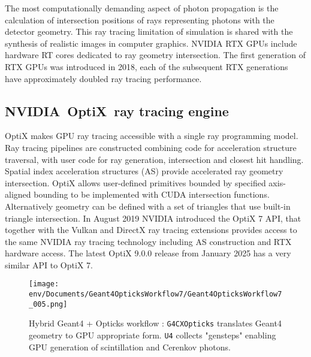 \documentclass{webofc}
\begin{document}
The most computationally demanding aspect of photon propagation
is the calculation of intersection positions of rays representing photons with the detector geometry.
This ray tracing limitation of simulation is shared with the synthesis of realistic images in computer graphics. 
NVIDIA RTX\cite{rtx} GPUs include hardware RT cores dedicated to ray geometry intersection. 
The first generation of RTX GPUs was introduced in 2018, each of the subsequent RTX generations have 
approximately doubled ray tracing performance.  
%
%
\subsection{NVIDIA\textregistered\ OptiX\texttrademark\ ray tracing engine}
%
OptiX makes GPU ray tracing accessible with a single ray programming model.
Ray tracing pipelines are constructed combining code for acceleration structure traversal, 
with user code for ray generation, intersection and closest hit handling.
Spatial index acceleration structures (AS) provide accelerated ray geometry intersection. 
%
OptiX allows user-defined primitives bounded by specified axis-aligned bounding
to be implemented with CUDA intersection functions. Alternatively geometry can be 
defined with a set of triangles that use built-in triangle intersection.  
%
In August 2019 NVIDIA introduced the OptiX 7 API\cite{optix7},
that together with the Vulkan and DirectX ray tracing extensions provides access 
to the same NVIDIA ray tracing technology including AS construction and RTX hardware access. 
The latest OptiX 9.0.0 release from January 2025 has a very similar API to OptiX 7.   
%
%
\begin{figure}[t]
\centering
\texttt{[image: env/Documents/Geant4OpticksWorkflow7/Geant4OpticksWorkflow7\_005.png]}
\caption{Hybrid Geant4 + Opticks workflow : {\tt G4CXOpticks} translates Geant4 geometry to GPU appropriate form. 
{\tt U4} collects "gensteps" enabling GPU generation of scintillation and Cerenkov photons.
}
\label{workflow} 
\vspace{-5mm}
\end{figure}
%
\end{document}
